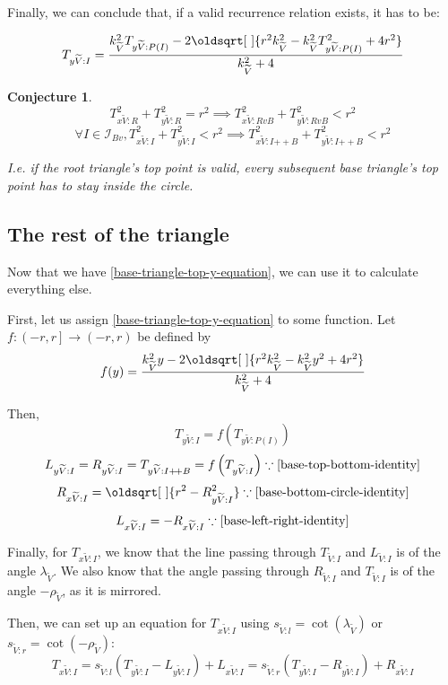 \documentclass[a4paper,12pt]{article}
\newcommand\doubleplus{\mathbin{+\!+}}
\newcommand{\HSview}[1][V]{\widetilde{#1}}
\newcommand{\HST}[1][I]{T_{\HSview:#1}}
\newcommand{\HSL}[1][I]{L_{\HSview:#1}}
\newcommand{\HSR}[1][I]{R_{\HSview:#1}}
\newcommand{\HSTx}[1][I]{T_{x\HSview:#1}}
\newcommand{\HSLx}[1][I]{L_{x\HSview:#1}}
\newcommand{\HSRx}[1][I]{R_{x\HSview:#1}}
\newcommand{\HSTy}[1][I]{T_{y\HSview:#1}}
\newcommand{\HSLy}[1][I]{L_{y\HSview:#1}}
\newcommand{\HSRy}[1][I]{R_{y\HSview:#1}}
\newcommand{\HSlambda}{\lambda_{\HSview}}
\newcommand{\HSrho}{\rho_{\HSview}}
\newcommand{\HSs}[1][d]{s_{\HSview:#1}}
\renewcommand*{\sqrt}[2][\ ]{\oldsqrt[#1]{#2} }
\newtheorem{conjecture}[theorem]{Conjecture}
\theoremstyle{definition}
\theoremstyle{plain}
\begin{document}
	Finally, we can conclude that, if a valid recurrence relation exists, it has to be:
	
	\begin{equation}
		\HSTy = \frac{
			k^2_{\HSview}\HSTy[P(I)] - 2\sqrt{
				r^2k^2_{\HSview} -
				k^2_{\HSview}\HSTy[P(I)]^2 +
				4r^2
			}
		}{k^2_{\HSview} + 4} \label{base-triangle-top-y-equation}
	\end{equation}

	\begin{conjecture} \label{base-valid-solution}
		$$\HSTx[R]^2 + \HSTy[R]^2 = r^2 \implies \HSTx[RvB]^2 + \HSTy[RvB]^2 < r^2$$
		$$\forall I \in \mathcal{I}_{Bv}, \HSTx^2 + \HSTy^2 < r^2 \implies \HSTx[I\doubleplus B]^2 + \HSTy[I\doubleplus B]^2 < r^2$$

		I.e. if the root triangle's top point is valid, every subsequent base triangle's top point has to stay inside the circle.
	\end{conjecture}

	\pagebreak

	\subsection{The rest of the triangle}

	Now that we have \eqref{base-triangle-top-y-equation}, we can use it to calculate everything else.

	First, let us assign \eqref{base-triangle-top-y-equation} to some function.
	Let $f : \left(-r, r\right] \to \left(-r, r\right)$ be defined by $$f(y) = \frac{k^2_{\HSview}y - 2\sqrt{r^2k^2_{\HSview} - k^2_{\HSview}y^2 + 4r^2}}{k^2_{\HSview} + 4}$$
	
	Then,
	$$\HSTy = f\left(\HSTy[P(I)]\right)$$
	$$\HSLy = \HSRy = \HSTy[I \doubleplus B] = f\left(\HSTy\right)
	\because \eqref{base-top-bottom-identity}$$
	$$\HSRx = \sqrt{r^2 - \HSRy^2}
	\because \eqref{base-bottom-circle-identity}$$
	$$\HSLx = -\HSRx \because \eqref{base-left-right-identity}$$

	Finally, for $\HSTx$, we know that the line passing through
	$\HST$ and $\HSL$ is of the angle $\HSlambda$.
	We also know that the angle passing through $\HSR$ and $\HST$ is of the angle $-\HSrho$, as it is mirrored.

	Then, we can set up an equation for $\HSTx$ using $\HSs[l] = \cot\left(\HSlambda\right)$ or $\HSs[r] = \cot\left(-\HSrho\right)$:
	$$\HSTx = \HSs[l]\left(\HSTy - \HSLy\right) + \HSLx = \HSs[r]\left(\HSTy - \HSRy\right) + \HSRx$$
	
\end{document}
